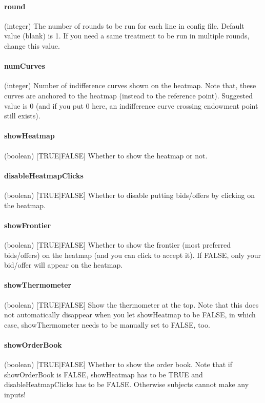 \documentclass[12pt]{article}
\begin{document}
\paragraph{round} (integer) The number of rounds to be run for each line in config file. Default value (blank) is 1. If you need a same treatment to be run in multiple rounds, change this value.

\paragraph{numCurves} (integer) Number of indifference curves shown on the heatmap. Note that, these curves are anchored to the heatmap (instead to the reference point). Suggested value is 0 (and if you put 0 here, an indifference curve crossing endowment point still exists).

\paragraph{showHeatmap} (boolean) [TRUE$|$FALSE] Whether to show the heatmap or not.

\paragraph{disableHeatmapClicks} (boolean) [TRUE$|$FALSE] Whether to disable putting bids/offers by clicking on the heatmap.

\paragraph{showFrontier} (boolean) [TRUE$|$FALSE] Whether to show the frontier (most preferred bids/offers) on the heatmap (and you can click to accept it). If FALSE, only your bid/offer will appear on the heatmap.

\paragraph{showThermometer} (boolean) [TRUE$|$FALSE] Show the thermometer at the top. Note that this does not automatically disappear when you let showHeatmap to be FALSE, in which case, showThermometer needs to be manually set to FALSE, too. 

\paragraph{showOrderBook} (boolean) [TRUE$|$FALSE] Whether to show the order book. Note that if showOrderBook is FALSE, showHeatmap has to be TRUE and disableHeatmapClicks has to be FALSE. Otherwise subjects  cannot make any inputs!
\end{document}
